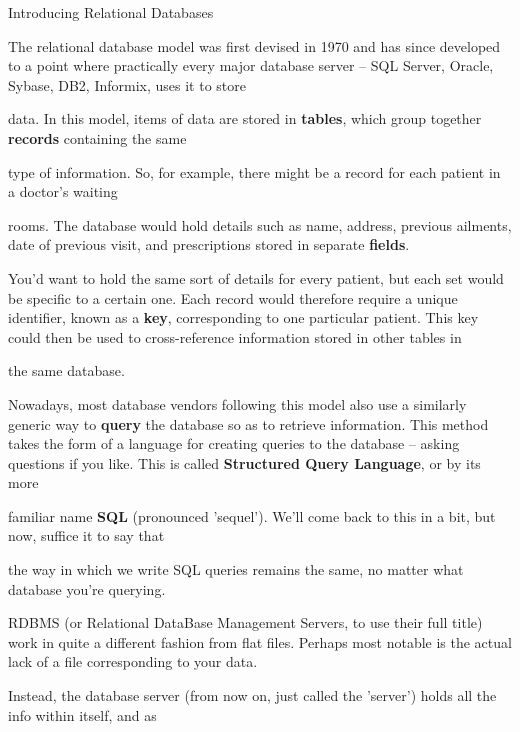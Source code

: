 \documentclass[a4paper,11pt]{book}
\begin{document}
\noindent 

\noindent Introducing Relational Databases

\noindent 

\noindent The relational database model was first devised in 1970 and has since developed to a point where practically every major database server -- SQL Server, Oracle, Sybase, DB2, Informix, uses it to store

\noindent data. In this model, items of data are stored in \textbf{tables}, which group together \textbf{records }containing the same

\noindent type of information. So, for example, there might be a record for each patient in a doctor's waiting

\noindent rooms. The database would hold details such as name, address, previous ailments, date of previous visit, and prescriptions stored in separate \textbf{fields}.

\noindent 

\noindent You'd want to hold the same sort of details for every patient, but each set would be specific to a certain one. Each record would therefore require a unique identifier, known as a \textbf{key}, corresponding to one particular patient. This key could then be used to cross-reference information stored in other tables in

\noindent the same database.

\noindent 

\noindent Nowadays, most database vendors following this model also use a similarly generic way to \textbf{query }the database so as to retrieve information. This method takes the form of a language for creating queries to the database -- asking questions if you like. This is called \textbf{Structured Query Language}, or by its more

\noindent familiar name \textbf{SQL }(pronounced 'sequel'). We'll come back to this in a bit, but now, suffice it to say that

\noindent the way in which we write SQL queries remains the same, no matter what database you're querying.

\noindent 

\noindent RDBMS (or Relational DataBase Management Servers, to use their full title) work in quite a different fashion from flat files. Perhaps most notable is the actual lack of a file corresponding to your data.

\noindent Instead, the database server (from now on, just called the 'server') holds all the info within itself, and as
\end{document}

